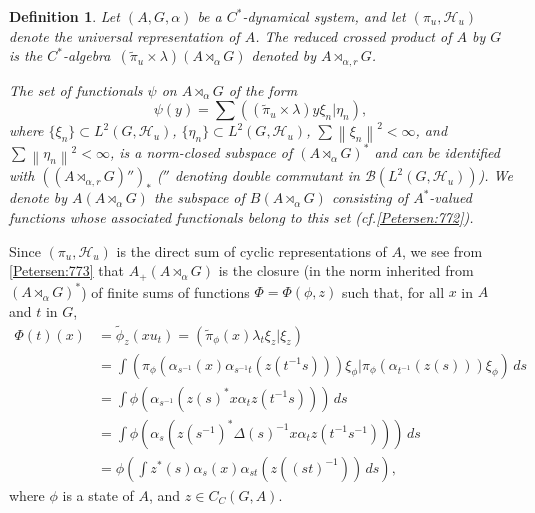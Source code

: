 \documentclass{book}
\newtheorem{definition}{Definition}[section]
\def\cstar{\(C^*\)-algebra}
\begin{document}
\begin{definition}\label{Petersen:774}
  Let \((A,G,\alpha)\) be a \(C^*\)-dynamical system, and let \((\pi_u,\mathcal{H}_u)\) denote the
  universal representation of \(A\). The \textnormal{reduced crossed product} of \(A\) by \(G\) is the \cstar\
  \((\tilde{\pi}_u\times\lambda)(A\rtimes_\alpha G)\) denoted by \(A\rtimes_{\alpha,r}G\).\par
  The set of functionals \(\psi\) on \(A\rtimes_\alpha G\) of the form
  \[
    \psi(y)=\sum((\tilde{\pi}_u\times\lambda)y\xi_n|\eta_n),
  \]
  where \(\{\xi_n\}\subset L^2(G,\mathcal{H}_u)\), \(\{\eta_n\}\subset L^2(G,\mathcal{H}_u)\),
  \(\sum\left\|\xi_n\right\|^2<\infty\), and \(\sum\left\|\eta_n\right\|^2<\infty\),
  is a norm-closed subspace of \((A\rtimes_\alpha G)^*\) and can be identified with
  \(((A\rtimes_{\alpha,r} G)'')_*\) (\(''\) denoting double commutant in \(\mathcal{B}(L^2(G,\mathcal{H}_u))\)).
  We denote by \(A(A\rtimes_\alpha G)\) the subspace of \(B(A\rtimes_\alpha G)\) 
  consisting of \(A^*\)-valued functions whose associated functionals belong to this set (cf.\ref{Petersen:772}).\par
\end{definition}
Since \((\pi_u,\mathcal{H}_u)\) is the direct sum of cyclic representations of \(A\),
we see from \ref{Petersen:773} that \(A_+(A\rtimes_\alpha G)\) is the 
closure (in the norm inherited from \((A\rtimes_\alpha G)^*\)) of 
finite sums of functions \(\Phi=\Phi(\phi,z)\) such that, for all \(x\) in \(A\) and \(t\) in \(G\),
\begin{align*}
  \Phi(t)(x)&=\tilde{\phi}_z(x u_t)=(\tilde{\pi}_\phi(x)\lambda_t\xi_z|\xi_z)\\
  &=\int(\pi_\phi(\alpha_{s^{-1}}(x)\alpha_{s^{-1}t}(z(t^{-1}s)))\xi_\phi|\pi_\phi(\alpha_{t^{-1}}(z(s)))\xi_\phi)\,ds\\
  &=\int\phi(\alpha_{s^{-1}}(z(s)^*x\alpha_t z(t^{-1}s)))\,ds\\
  &=\int\phi(\alpha_s(z(s^{-1})^*\Delta(s)^{-1}x\alpha_t z(t^{-1}s^{-1})))\,ds\\
  &=\phi\left( \int z^*(s)\alpha_s(x)\alpha_{st}(z((st)^{-1}))\,ds\right),
\end{align*}
where \(\phi\) is a state of \(A\), and \(z\in C_C(G,A)\).
\end{document}
